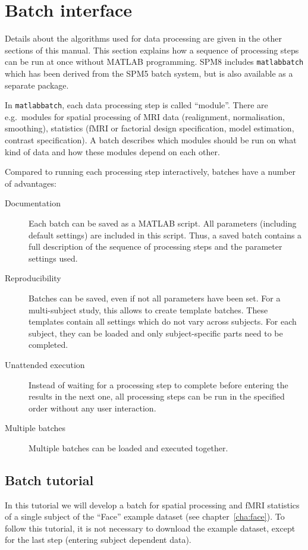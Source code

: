 \chapter{Batch interface}
\label{cha:batch_interface}

Details about the algorithms used for data processing are given in the other
sections of this manual. This section explains how a sequence of processing
steps can be run at once without MATLAB programming. SPM8 includes
\texttt{matlabbatch}\cite{matlabbatch} which has been derived from the SPM5
batch system, but is also available as a separate package.

In \texttt{matlabbatch}, each data processing step is called ``module''. There
are e.g.\ modules for spatial processing of MRI data (realignment,
normalisation, smoothing), statistics (fMRI or factorial design specification,
model estimation, contrast specification). A batch describes which modules
should be run on what kind of data and how these modules depend on each other.

Compared to running each processing step interactively, batches have a number
of advantages:
\begin{description}
\item[Documentation] Each batch can be saved as a MATLAB script. All
  parameters (including default settings) are included in this script. Thus, a
  saved batch contains a full description of the sequence of processing steps
  and the parameter settings used.
\item[Reproducibility] Batches can be saved, even if not all parameters have
  been set. For a multi-subject study, this allows to create template batches.
  These templates contain all settings which do not vary across subjects. For
  each subject, they can be loaded and only subject-specific parts need to be
  completed.
\item[Unattended execution] Instead of waiting for a processing step to
  complete before entering the results in the next one, all processing steps
  can be run in the specified order without any user interaction.
\item[Multiple batches] Multiple batches can be loaded and executed together.
\end{description}

\section{Batch tutorial}

In this tutorial we will develop a batch for spatial processing and fMRI
statistics of a single subject of the ``Face'' example dataset (see
chapter~\ref{cha:face}). To follow this tutorial, it is not necessary to
download the example dataset, except for the last step (entering subject
dependent data).

